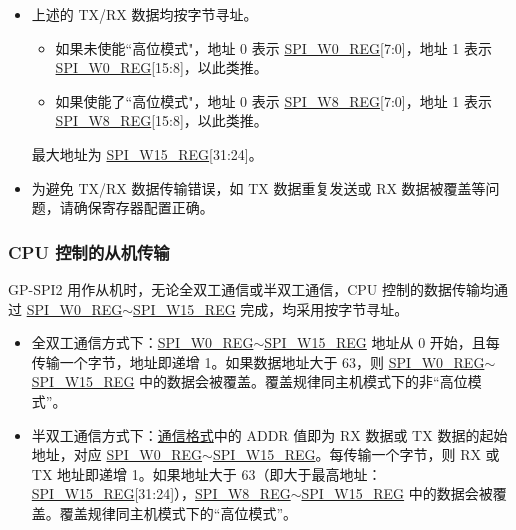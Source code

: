 \documentclass[main\_\_CN.tex]{subfiles}
\begin{document}
\begin{tiplisting}
\vspace{-2em}
\begin{itemize}
    \item 上述的 TX/RX 数据均按字节寻址。
    \begin{itemize}
        \item 如果未使能``高位模式"，地址 0 表示 \hyperref[regdesc:SPIW0REG]{SPI\_W0\_REG}[7:0]，地址 1 表示 \hyperref[regdesc:SPIW0REG]{SPI\_W0\_REG}[15:8]，以此类推。
        \item 如果使能了``高位模式"，地址 0 表示 \hyperref[regdesc:SPIW8REG]{SPI\_W8\_REG}[7:0]，地址 1 表示 \hyperref[regdesc:SPIW8REG]{SPI\_W8\_REG}[15:8]，以此类推。
    \end{itemize}
    最大地址为 \hyperref[regdesc:SPIW15REG]{SPI\_W15\_REG}[31:24]。
    \item 为避免 TX/RX 数据传输错误，如 TX 数据重复发送或 RX 数据被覆盖等问题，请确保寄存器配置正确。
\end{itemize}
\end{tiplisting}

\subsubsection{CPU 控制的从机传输}

GP-SPI2 用作从机时，无论全双工通信或半双工通信，CPU 控制的数据传输均通过 \hyperref[regdesc:SPIW0REG]{SPI\_W0\_REG}$\sim$\hyperref[regdesc:SPIW15REG]{SPI\_W15\_REG} 完成，均采用按字节寻址。

\begin{itemize}
    \item 全双工通信方式下：\hyperref[regdesc:SPIW0REG]{SPI\_W0\_REG}$\sim$\hyperref[regdesc:SPIW15REG]{SPI\_W15\_REG} 地址从 0 开始，且每传输一个字节，地址即递增 1。如果数据地址大于 63，则 \hyperref[regdesc:SPIW0REG]{SPI\_W0\_REG}$\sim$\hyperref[regdesc:SPIW15REG]{SPI\_W15\_REG} 中的数据会被覆盖。覆盖规律同主机模式下的非“高位模式”。
    \item 半双工通信方式下：\hyperref[sec:slave-communication-format]{通信格式}中的 ADDR 值即为 RX 数据或 TX 数据的起始地址，对应 \hyperref[regdesc:SPIW0REG]{SPI\_W0\_REG}$\sim$\hyperref[regdesc:SPIW15REG]{SPI\_W15\_REG}。每传输一个字节，则 RX 或 TX 地址即递增 1。如果地址大于 63（即大于最高地址：\hyperref[regdesc:SPIW15REG]{SPI\_W15\_REG}[31:24]），\hyperref[regdesc:SPIW8REG]{SPI\_W8\_REG}$\sim$\hyperref[regdesc:SPIW15REG]{SPI\_W15\_REG} 中的数据会被覆盖。覆盖规律同主机模式下的“高位模式”。
\end{itemize}
\end{document}
